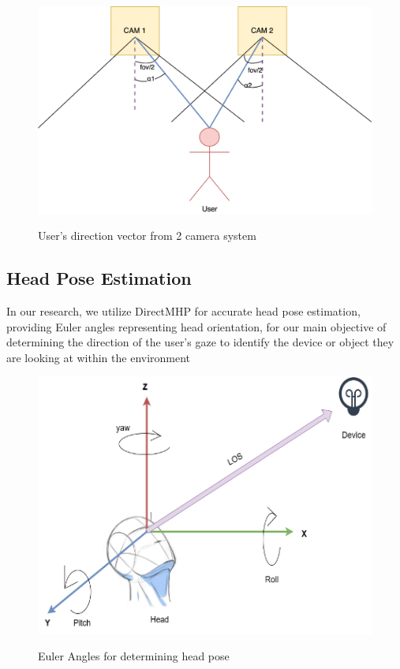 \begin{figure}[!t]
	\centering
	\includegraphics[scale=1]{images/triangulation_concept.png} \\
	\caption{User’s direction vector from 2 camera system }
	\label{fig: User’s direction vector from 2 camera system }
\end{figure}


\subsection{Head Pose Estimation}
In our research, we utilize DirectMHP for accurate head pose estimation, providing Euler angles representing head orientation, for our main objective of determining the direction of the user's gaze to identify the device or object they are looking at within the environment

\begin{figure}[!t]
	\centering
	\includegraphics[scale=0.9]{images/euler_angles.png} \\
	\caption{Euler Angles for determining head pose }
	\label{fig: Euler Angles for determining head pose }
\end{figure}

